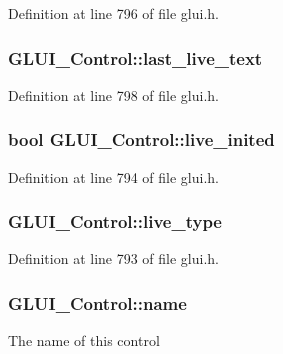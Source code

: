 Definition at line 796 of file glui.\+h.

\hypertarget{class_g_l_u_i___control_ac77569805eb6ccfce3f4ff1d09c309b6}{
\subsubsection[{last\+\_\+live\+\_\+text}]{ G\+L\+U\+I\+\_\+\+Control\+::last\+\_\+live\+\_\+text}}\label{class_g_l_u_i___control_ac77569805eb6ccfce3f4ff1d09c309b6}


Definition at line 798 of file glui.\+h.

\hypertarget{class_g_l_u_i___control_a74977797cf84a38ef78de8c548bc2d25}{
\subsubsection[{live\+\_\+inited}]{\setlength{\rightskip}{0pt plus 5cm}bool G\+L\+U\+I\+\_\+\+Control\+::live\+\_\+inited}}\label{class_g_l_u_i___control_a74977797cf84a38ef78de8c548bc2d25}


Definition at line 794 of file glui.\+h.

\hypertarget{class_g_l_u_i___control_a8ba7cae809a47dd870592aa2cc85483b}{
\subsubsection[{live\+\_\+type}]{ G\+L\+U\+I\+\_\+\+Control\+::live\+\_\+type}}\label{class_g_l_u_i___control_a8ba7cae809a47dd870592aa2cc85483b}


Definition at line 793 of file glui.\+h.

\hypertarget{class_g_l_u_i___control_aa95b97d50df45335fc33f0af03958eb3}{
\subsubsection[{name}]{ G\+L\+U\+I\+\_\+\+Control\+::name}}\label{class_g_l_u_i___control_aa95b97d50df45335fc33f0af03958eb3}
The name of this control 

